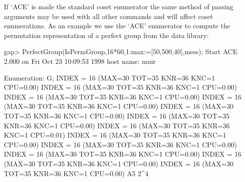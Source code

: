 If `ACE' is made the standard coset enumerator the same method of passing
arguments may be used with all other commands and will affect coset
enumerations. As an example we use the `ACE' enumerator to compute the
permutation representation of a perfect group from the data library:

\begintt
gap> PerfectGroup(IsPermGroup,16*60,1:max:=[50,500,40],mess);
Start ACE 2.000 on Fri Oct 23 10:09:53 1998
host name: muir

Enumeration: G;
INDEX = 16 (MAX=30 TOT=35 KNR=36 KNC=1 CPU=0.00)
INDEX = 16 (MAX=30 TOT=35 KNR=36 KNC=1 CPU=0.00)
INDEX = 16 (MAX=30 TOT=35 KNR=36 KNC=1 CPU=0.00)
INDEX = 16 (MAX=30 TOT=35 KNR=36 KNC=1 CPU=0.00)
INDEX = 16 (MAX=30 TOT=35 KNR=36 KNC=1 CPU=0.00)
INDEX = 16 (MAX=30 TOT=35 KNR=36 KNC=1 CPU=0.00)
INDEX = 16 (MAX=30 TOT=35 KNR=36 KNC=1 CPU=0.01)
INDEX = 16 (MAX=30 TOT=35 KNR=36 KNC=1 CPU=0.00)
INDEX = 16 (MAX=30 TOT=35 KNR=36 KNC=1 CPU=0.00)
INDEX = 16 (MAX=30 TOT=35 KNR=36 KNC=1 CPU=0.00)
INDEX = 16 (MAX=30 TOT=35 KNR=36 KNC=1 CPU=0.00)
INDEX = 16 (MAX=30 TOT=35 KNR=36 KNC=1 CPU=0.00)
A5 2^4
\endtt
